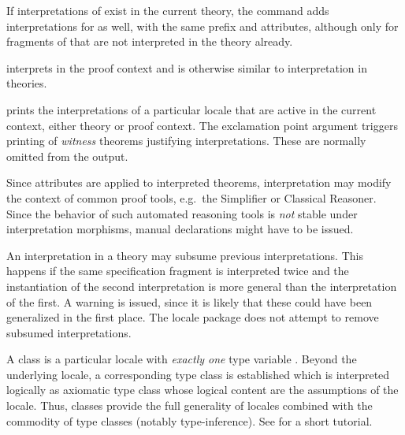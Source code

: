 \begin{isabellebody}
\begin{isamarkuptext}
\begin{descr}
  If interpretations of  exist in the current theory, the
  command adds interpretations for  as well, with the same
  prefix and attributes, although only for fragments of 
  that are not interpreted in the theory already.

  \item [\mbox{\isa{\isacommand{interpret}}}~\isa{{\isachardoublequote}expr\ insts\ {\isasymWHERE}\ eqns{\isachardoublequote}}]
  interprets  in the proof context and is otherwise
  similar to interpretation in theories.

  \item [\mbox{\isa{\isacommand{print{\isacharunderscore}interps}}}~\isa{loc}] prints the
  interpretations of a particular locale  that are active
  in the current context, either theory or proof context.  The
  exclamation point argument triggers printing of \emph{witness}
  theorems justifying interpretations.  These are normally omitted
  from the output.
  
  \end{descr}

  \begin{warn}
    Since attributes are applied to interpreted theorems,
    interpretation may modify the context of common proof tools, e.g.\
    the Simplifier or Classical Reasoner.  Since the behavior of such
    automated reasoning tools is \emph{not} stable under
    interpretation morphisms, manual declarations might have to be
    issued.
  \end{warn}

  \begin{warn}
    An interpretation in a theory may subsume previous
    interpretations.  This happens if the same specification fragment
    is interpreted twice and the instantiation of the second
    interpretation is more general than the interpretation of the
    first.  A warning is issued, since it is likely that these could
    have been generalized in the first place.  The locale package does
    not attempt to remove subsumed interpretations.
  \end{warn}%
\end{isamarkuptext}%
\isamarkuptrue%
%
\isamarkuptrue%
%
\begin{isamarkuptext}%
A class is a particular locale with \emph{exactly one} type variable
  \isa{{\isasymalpha}}.  Beyond the underlying locale, a corresponding type class
  is established which is interpreted logically as axiomatic type
  class \cite{Wenzel:1997:TPHOL} whose logical content are the
  assumptions of the locale.  Thus, classes provide the full
  generality of locales combined with the commodity of type classes
  (notably type-inference).  See \cite{isabelle-classes} for a short
  tutorial.


\end{isamarkuptext}
\end{isabellebody}
